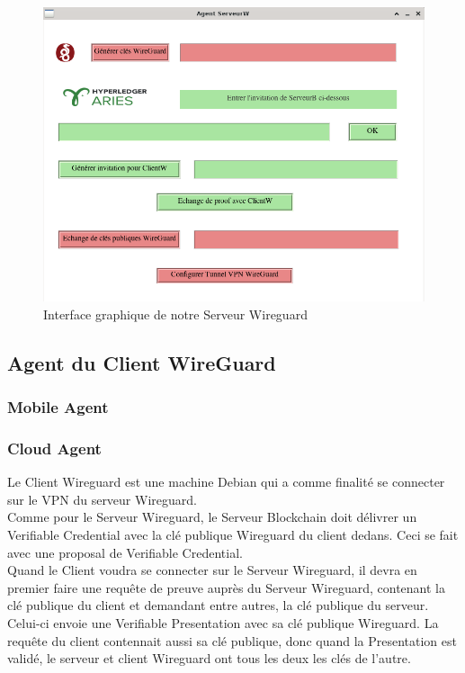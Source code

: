 \documentclass[12pt, openany]{report}
\begin{document}
\begin{flushleft}
\begin{figure}[H]
\includegraphics[scale=0.5]{serveurW.png}
\centering
\caption{Interface graphique de notre Serveur Wireguard}
\end{figure}

\end{flushleft}

\subsection{Agent du Client WireGuard}
\subsubsection{Mobile Agent}
\noindent
\begin{flushleft}

\end{flushleft}


\subsubsection{Cloud Agent}
\noindent 
\begin{flushleft}
Le Client Wireguard est une machine Debian qui a comme finalité se connecter sur le VPN du serveur Wireguard. \\
Comme pour le Serveur Wireguard, le Serveur Blockchain doit délivrer un Verifiable Credential avec la clé publique Wireguard du client dedans. Ceci se fait avec une proposal de Verifiable Credential. \\
Quand le Client voudra se connecter sur le Serveur Wireguard, il devra en premier faire une requête de preuve auprès du Serveur Wireguard, contenant la clé publique du client et demandant entre autres, la clé publique du serveur. Celui-ci envoie une Verifiable Presentation avec sa clé publique Wireguard. La requête du client contennait aussi sa clé publique, donc quand la Presentation est validé, le serveur et client Wireguard ont tous les deux les clés de l'autre.

\end{flushleft}
\end{document}
